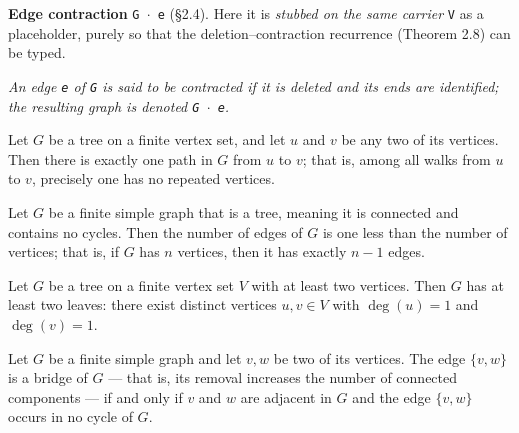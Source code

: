 \begin{definition}[contract]
\label{SimpleGraph.contract}
\textbf{Edge contraction} \texttt{G $\cdot$ e} (\S{}2.4). Here it is \emph{stubbed on
the same carrier} \texttt{V} as a placeholder, purely so that the deletion--contraction
recurrence (Theorem 2.8) can be typed.

\emph{An edge \texttt{e} of \texttt{G} is said to be contracted if it is
deleted and its ends are identified; the resulting graph is denoted \texttt{G $\cdot$
e}.}
\end{definition}

\begin{theorem}
\label{SimpleGraph.tree_unique_path}
\leanok
Let $G$ be a tree on a finite vertex set, and let $u$ and $v$ be any two of its
vertices. Then there is exactly one path in $G$ from $u$ to $v$; that is, among all
walks from $u$ to $v$, precisely one has no repeated vertices.
\end{theorem}

\begin{theorem}
\label{SimpleGraph.tree_card_edgeFinset}
\leanok
Let $G$ be a finite simple graph that is a tree, meaning it is connected and contains no
cycles. Then the number of edges of $G$ is one less than the number of vertices; that
is, if $G$ has $n$ vertices, then it has exactly $n - 1$ edges.
\end{theorem}

\begin{theorem}
\label{SimpleGraph.tree_two_leaves}
\leanok
Let $G$ be a tree on a finite vertex set $V$ with at least two vertices. Then $G$ has at
least two leaves: there exist distinct vertices $u, v \in V$ with $\deg(u) = 1$ and
$\deg(v) = 1$.
\end{theorem}

\begin{theorem}
\label{SimpleGraph.cutEdge_iff_no_cycle}
\leanok
Let $G$ be a finite simple graph and let $v,w$ be two of its vertices. The edge
$\{v,w\}$ is a bridge of $G$ — that is, its removal increases the number of connected
components — if and only if $v$ and $w$ are adjacent in $G$ and the edge $\{v,w\}$
occurs in no cycle of $G$.
\end{theorem}

